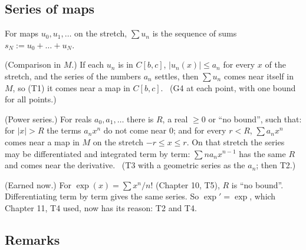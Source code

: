 \subsection*{Series of maps}

\begin{lines}
\item[\lab{N1}] For maps $u_0, u_1, \dots$ on the stretch, $\sum u_n$ is the sequence of sums $s_N := u_0 + \dots + u_N$.
\item[\lab{T3}] (Comparison in $M$.) If each $u_n$ is in $C[b,c]$, $|u_n(x)| \le a_n$ for every $x$ of the stretch, and the series of the numbers $a_n$ settles, then $\sum u_n$ comes near itself in $M$, so (T1) it comes near a map in $C[b,c]$. \ (G4 at each point, with one bound for all points.)
\item[\lab{T4}] (Power series.) For reals $a_0, a_1, \dots$ there is $R$, a real $\ge 0$ or ``no bound'', such that: for $|x| > R$ the terms $a_n x^n$ do not come near $0$; and for every $r < R$, $\sum a_n x^n$ comes near a map in $M$ on the stretch $-r \le x \le r$. On that stretch the series may be differentiated and integrated term by term: $\sum n a_n x^{n-1}$ has the same $R$ and comes near the derivative. \ (T3 with a geometric series as the $a_n$; then T2.)
\item[\lab{T5}] (Earned now.) For $\exp(x) = \sum x^n / n!$ (Chapter 10, T5), $R$ is ``no bound''. Differentiating term by term gives the same series. So $\exp' = \exp$, which Chapter 11, T4 used, now has its reason: T2 and T4.
\end{lines}

\subsection*{Remarks}

